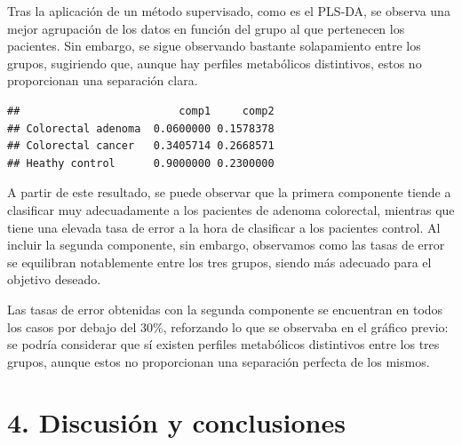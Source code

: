 \documentclass[
]{article}
\newenvironment{Shaded}{\begin{snugshade}}{\end{snugshade}}
\newcommand{\AttributeTok}[1]{\textcolor[rgb]{0.13,0.29,0.53}{#1}}
\newcommand{\CommentTok}[1]{\textcolor[rgb]{0.56,0.35,0.01}{\textit{#1}}}
\newcommand{\DecValTok}[1]{\textcolor[rgb]{0.00,0.00,0.81}{#1}}
\newcommand{\FunctionTok}[1]{\textcolor[rgb]{0.13,0.29,0.53}{\textbf{#1}}}
\newcommand{\NormalTok}[1]{#1}
\newcommand{\OtherTok}[1]{\textcolor[rgb]{0.56,0.35,0.01}{#1}}
\newcommand{\SpecialCharTok}[1]{\textcolor[rgb]{0.81,0.36,0.00}{\textbf{#1}}}
\newcommand{\StringTok}[1]{\textcolor[rgb]{0.31,0.60,0.02}{#1}}
\begin{document}
Tras la aplicación de un método supervisado, como es el PLS-DA, se
observa una mejor agrupación de los datos en función del grupo al que
pertenecen los pacientes. Sin embargo, se sigue observando bastante
solapamiento entre los grupos, sugiriendo que, aunque hay perfiles
metabólicos distintivos, estos no proporcionan una separación clara.

\begin{Shaded}
\end{Shaded}

\begin{verbatim}
##                         comp1     comp2
## Colorectal adenoma  0.0600000 0.1578378
## Colorectal cancer   0.3405714 0.2668571
## Heathy control      0.9000000 0.2300000
\end{verbatim}

A partir de este resultado, se puede observar que la primera componente
tiende a clasificar muy adecuadamente a los pacientes de adenoma
colorectal, mientras que tiene una elevada tasa de error a la hora de
clasificar a los pacientes control. Al incluir la segunda componente,
sin embargo, observamos como las tasas de error se equilibran
notablemente entre los tres grupos, siendo más adecuado para el objetivo
deseado.

Las tasas de error obtenidas con la segunda componente se encuentran en
todos los casos por debajo del 30\%, reforzando lo que se observaba en
el gráfico previo: se podría considerar que sí existen perfiles
metabólicos distintivos entre los tres grupos, aunque estos no
proporcionan una separación perfecta de los mismos.

\section{4. Discusión y conclusiones}\label{discusiuxf3n-y-conclusiones}
\end{document}
